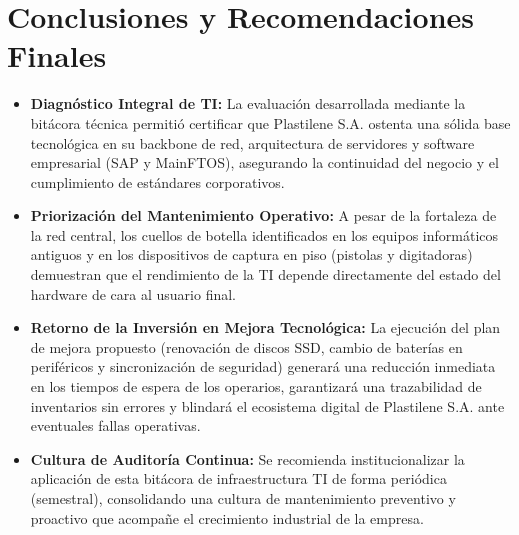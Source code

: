 	\section{Conclusiones y Recomendaciones Finales}
		\begin{itemize}
			\item \textbf{Diagnóstico Integral de TI:} La evaluación desarrollada mediante la bitácora técnica permitió certificar que Plastilene S.A. ostenta una sólida base tecnológica en su backbone de red, arquitectura de servidores y software empresarial (SAP y MainFTOS), asegurando la continuidad del negocio y el cumplimiento de estándares corporativos.
			\item \textbf{Priorización del Mantenimiento Operativo:} A pesar de la fortaleza de la red central, los cuellos de botella identificados en los equipos informáticos antiguos y en los dispositivos de captura en piso (pistolas y digitadoras) demuestran que el rendimiento de la TI depende directamente del estado del hardware de cara al usuario final.
			\item \textbf{Retorno de la Inversión en Mejora Tecnológica:} La ejecución del plan de mejora propuesto (renovación de discos SSD, cambio de baterías en periféricos y sincronización de seguridad) generará una reducción inmediata en los tiempos de espera de los operarios, garantizará una trazabilidad de inventarios sin errores y blindará el ecosistema digital de Plastilene S.A. ante eventuales fallas operativas.
			\item \textbf{Cultura de Auditoría Continua:} Se recomienda institucionalizar la aplicación de esta bitácora de infraestructura TI de forma periódica (semestral), consolidando una cultura de mantenimiento preventivo y proactivo que acompañe el crecimiento industrial de la empresa.
		\end{itemize}

    \nocite{*} %
	\printbibliography[title={Referencias}]
		
